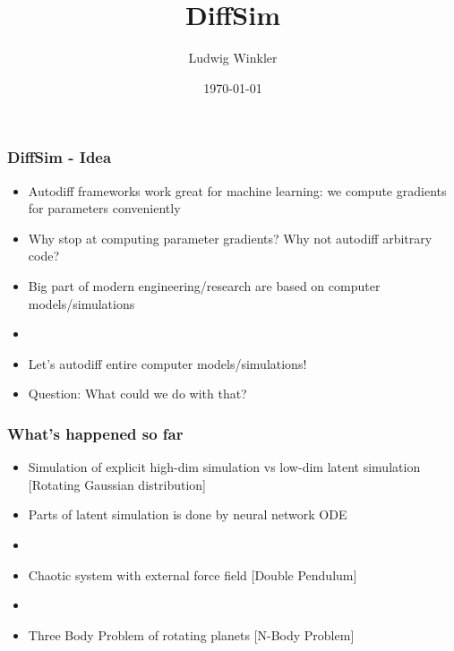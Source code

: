 \documentclass[usenames, dvipsnames, t]{beamer}
\title{DiffSim }
\subtitle{}
\author{Ludwig Winkler}
\institute{Machine Learning Group \\ TU Berlin}
\date{\today}
\begin{document}
\def\mathn#1{\mathnormal{#1}}
\def\thet{\bm{\theta}}
\def\V{\mathn{V}}
\def\Q{\mathn{Q}}
\def\R{\mathn{R}}
\def\r{\mathn{r}}
\def\G{\mathn{G}}
\def\n{\mathn{n}}
\def\A{\mathn{A}}
\def\T{\mathn{T}}
\def\W{\mathn{W}}

\def\w{\mathn{w}}
\def\p{\mathn{p}}
\def\q{\mathn{q}}
\def\a{\mathn{a}}
\def\r{\mathn{r}}
\def\s{\mathn{s}}
\def\t{\mathn{t}}
\def\dist{1}

\newcommand{\E}{\mathbb{E}}



\begin{frame}
	\titlepage
\end{frame}


\begin{frame}
	\frametitle{DiffSim - Idea}
	\begin{itemize}
		\item Autodiff frameworks work great for machine learning: we compute gradients for parameters conveniently
		\item Why stop at computing parameter gradients? Why not autodiff arbitrary code?
		\item Big part of modern engineering/research are based on computer models/simulations
		\item[]
		\item Let's autodiff entire computer models/simulations!
		\item Question: What could we do with that?
	\end{itemize}
\end{frame}

\begin{frame}
	\frametitle{What's happened so far}
	\begin{itemize}
		\item Simulation of explicit high-dim simulation vs low-dim latent simulation [Rotating Gaussian distribution]
		\item Parts of latent simulation is done by neural network ODE
		\item[] 
		\item Chaotic system with external force field [Double Pendulum]
		\item[] 
		\item Three Body Problem of rotating planets [N-Body Problem]
	\end{itemize}
\end{frame}
\end{document}
